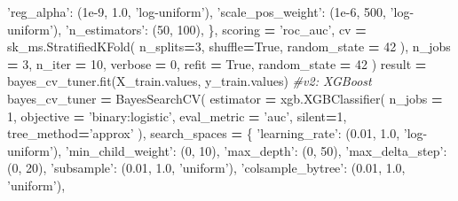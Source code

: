 \documentclass[]{book}
\newenvironment{Shaded}{\begin{snugshade}}{\end{snugshade}}
\newcommand{\DecValTok}[1]{\textcolor[rgb]{0.00,0.00,0.81}{#1}}
\newcommand{\FloatTok}[1]{\textcolor[rgb]{0.00,0.00,0.81}{#1}}
\newcommand{\StringTok}[1]{\textcolor[rgb]{0.31,0.60,0.02}{#1}}
\newcommand{\CommentTok}[1]{\textcolor[rgb]{0.56,0.35,0.01}{\textit{#1}}}
\newcommand{\VariableTok}[1]{\textcolor[rgb]{0.00,0.00,0.00}{#1}}
\newcommand{\OperatorTok}[1]{\textcolor[rgb]{0.81,0.36,0.00}{\textbf{#1}}}
\newcommand{\NormalTok}[1]{#1}
\begin{document}
\begin{Shaded}
\begin{Highlighting}[]
        \StringTok{'reg_alpha'}\NormalTok{: (}\FloatTok{1e-9}\NormalTok{, }\FloatTok{1.0}\NormalTok{, }\StringTok{'log-uniform'}\NormalTok{),}
        \StringTok{'scale_pos_weight'}\NormalTok{: (}\FloatTok{1e-6}\NormalTok{, }\DecValTok{500}\NormalTok{, }\StringTok{'log-uniform'}\NormalTok{),}
        \StringTok{'n_estimators'}\NormalTok{: (}\DecValTok{50}\NormalTok{, }\DecValTok{100}\NormalTok{),}
\NormalTok{    \},    }
\NormalTok{    scoring }\OperatorTok{=} \StringTok{'roc_auc'}\NormalTok{,}
\NormalTok{    cv }\OperatorTok{=}\NormalTok{ sk_ms.StratifiedKFold(}
\NormalTok{        n_splits}\OperatorTok{=}\DecValTok{3}\NormalTok{,}
\NormalTok{        shuffle}\OperatorTok{=}\VariableTok{True}\NormalTok{,}
\NormalTok{        random_state }\OperatorTok{=} \DecValTok{42}
\NormalTok{    ),}
\NormalTok{    n_jobs }\OperatorTok{=} \DecValTok{3}\NormalTok{,}
\NormalTok{    n_iter }\OperatorTok{=} \DecValTok{10}\NormalTok{,   }
\NormalTok{    verbose }\OperatorTok{=} \DecValTok{0}\NormalTok{,}
\NormalTok{    refit }\OperatorTok{=} \VariableTok{True}\NormalTok{,}
\NormalTok{    random_state }\OperatorTok{=} \DecValTok{42}
\NormalTok{)}
\NormalTok{result }\OperatorTok{=}\NormalTok{ bayes_cv_tuner.fit(X_train.values, y_train.values)}
\CommentTok{#v2: XGBoost}
\NormalTok{bayes_cv_tuner }\OperatorTok{=}\NormalTok{ BayesSearchCV(}
\NormalTok{    estimator }\OperatorTok{=}\NormalTok{ xgb.XGBClassifier(}
\NormalTok{        n_jobs }\OperatorTok{=} \DecValTok{1}\NormalTok{,}
\NormalTok{        objective }\OperatorTok{=} \StringTok{'binary:logistic'}\NormalTok{,}
\NormalTok{        eval_metric }\OperatorTok{=} \StringTok{'auc'}\NormalTok{,}
\NormalTok{        silent}\OperatorTok{=}\DecValTok{1}\NormalTok{,}
\NormalTok{        tree_method}\OperatorTok{=}\StringTok{'approx'}
\NormalTok{    ),}
\NormalTok{    search_spaces }\OperatorTok{=}\NormalTok{ \{}
        \StringTok{'learning_rate'}\NormalTok{: (}\FloatTok{0.01}\NormalTok{, }\FloatTok{1.0}\NormalTok{, }\StringTok{'log-uniform'}\NormalTok{),}
        \StringTok{'min_child_weight'}\NormalTok{: (}\DecValTok{0}\NormalTok{, }\DecValTok{10}\NormalTok{),}
        \StringTok{'max_depth'}\NormalTok{: (}\DecValTok{0}\NormalTok{, }\DecValTok{50}\NormalTok{),}
        \StringTok{'max_delta_step'}\NormalTok{: (}\DecValTok{0}\NormalTok{, }\DecValTok{20}\NormalTok{),}
        \StringTok{'subsample'}\NormalTok{: (}\FloatTok{0.01}\NormalTok{, }\FloatTok{1.0}\NormalTok{, }\StringTok{'uniform'}\NormalTok{),}
        \StringTok{'colsample_bytree'}\NormalTok{: (}\FloatTok{0.01}\NormalTok{, }\FloatTok{1.0}\NormalTok{, }\StringTok{'uniform'}\NormalTok{),}

\end{Highlighting}
\end{Shaded}
\end{document}
